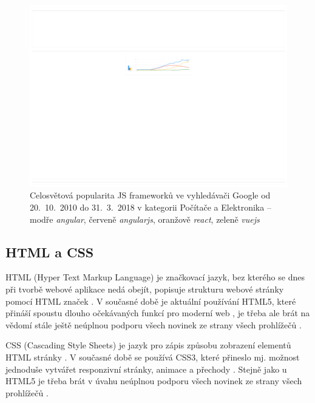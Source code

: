     \begin{figure}[!hb]\centering
    	\includegraphics[width=1\textwidth]{img/js-frameworks}
    	\caption[Popularita JS frameworků ve vyhledávači Google]{Celosvětová popularita JS frameworků ve vyhledávači Google od 20.~10.~2010 do 31.~3.~2018 v kategorii Počítače a Elektronika -- modře \textit{angular}, červeně \textit{angularjs}, oranžově \textit{react}, zeleně \textit{vuejs} \cite{trends-google}}\label{fig:js-frameworks}
    \end{figure}
    
        \subsection{HTML a CSS}
        HTML (Hyper Text Markup Language) je značkovací jazyk, bez kterého se dnes při tvorbě webové aplikace nedá obejít, popisuje strukturu webové stránky pomocí HTML značek \cite{html1}. V současné době je aktuální používání HTML5, které přináší spoustu dlouho očekávaných funkcí pro moderní web \cite{html2}, je třeba ale brát na vědomí stále ještě neúplnou podporu všech novinek ze strany všech prohlížečů \cite{html3}.
        
        CSS (Cascading Style Sheets) je jazyk pro zápis způsobu zobrazení elementů HTML stránky \cite{css2}. V současné době se používá CSS3, které přineslo mj. možnost jednoduše vytvářet responzivní stránky, animace a přechody \cite{css3}. Stejně jako u HTML5 je třeba brát v úvahu neúplnou podporu všech novinek ze strany všech prohlížečů \cite{css1}.
        
